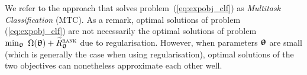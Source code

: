 We refer to the approach that solves problem~(\ref{eq:expobj_clf}) as \emph{Multitask Classification} (MTC). %
As a remark, optimal solutions of problem (\ref{eq:expobj_clf}) are not necessarily the optimal solutions 
of problem $\min_{\bm{\uptheta}} \ \Omega({\bm{\uptheta}}) + \widetilde R_{{\bm{\uptheta}}}^{\textsc{rank}}$ due to regularisation. %
However, when parameters ${\bm{\uptheta}}$ are small (which is generally the case when using regularisation),
optimal solutions of the two objectives can nonetheless approximate each other well.





%


